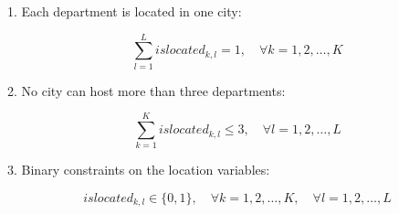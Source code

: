 \documentclass{article}
\begin{document}
1. Each department is located in one city: 

\[
\sum_{l=1}^{L} islocated_{k, l} = 1, \quad \forall k = 1, 2, \ldots, K
\]

2. No city can host more than three departments:

\[
\sum_{k=1}^{K} islocated_{k, l} \leq 3, \quad \forall l = 1, 2, \ldots, L
\]

3. Binary constraints on the location variables:

\[
islocated_{k, l} \in \{0, 1\}, \quad \forall k = 1, 2, \ldots, K, \quad \forall l = 1, 2, \ldots, L
\]
\end{document}

